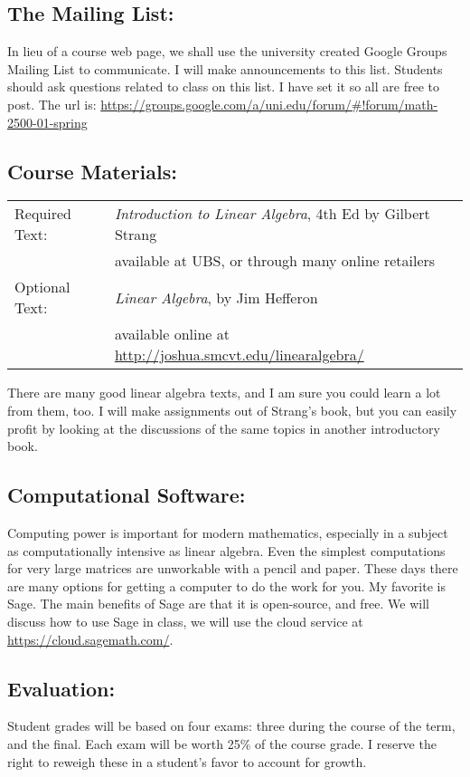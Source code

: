 \documentclass[10pt]{article}
\begin{document}
\subsection*{The Mailing List:}
	In lieu of a course web page, we shall use the university created Google Groups Mailing List to communicate. I will make announcements to this list. Students should ask questions related to class on this list. I have set it so all are free to post. The url is:
\url{https://groups.google.com/a/uni.edu/forum/#!forum/math-2500-01-spring}

\subsection*{Course Materials:}
\begin{tabular}{ll}
Required Text: & \emph{Introduction to Linear Algebra}, 4th Ed by Gilbert Strang \\
                        & available at UBS, or through many online retailers \\

Optional Text: & \emph{Linear Algebra}, by Jim Hefferon\\
                       & available online at \url{http://joshua.smcvt.edu/linearalgebra/} \\
\end{tabular}

There are many good linear algebra texts, and I am sure you could learn a lot from them, too. I will make assignments out of Strang’s book, but you can easily profit by looking at the discussions of the same topics in another introductory book.

\subsection*{Computational Software:}
	Computing power is important for modern mathematics, especially in a subject as computationally intensive as linear algebra. Even the simplest computations for very large matrices are unworkable with a pencil and paper. These days there are many options for getting a computer to do the work for you. My favorite is Sage. The main benefits of Sage are that it is open-source, and free. We will discuss how to use Sage in class, we will use the cloud service at \url{https://cloud.sagemath.com/}.

\subsection*{Evaluation:}
	Student grades will be based on four exams: three during the course of the term, and the final. Each exam will be worth 25\% of the course grade. I reserve the right to reweigh these in a student’s favor to account for growth.
\end{document}
